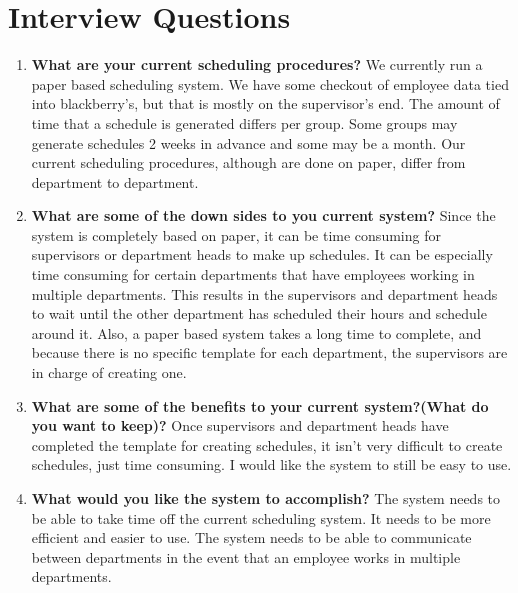 \documentclass[letterpaper,12pt]{report}
\begin{document}
\chapter{Interview Questions}
\lhead{\textcolor{custom}{\appendixname \space \thechapter}}
\begin{enumerate}
 \item \textbf{What are your current scheduling procedures?}\newline
We currently run a paper based scheduling system. We have some checkout of employee data tied into blackberry’s, but that is mostly on the supervisor’s end. The amount of time that a schedule is generated differs per group. Some groups may generate schedules 2 weeks in advance and some may be a month. Our current scheduling procedures, although are done on paper, differ from department to department.
 \item \textbf{What are some of the down sides to you current system?} \newline
 Since the system is completely based on paper, it can be time consuming for supervisors or department heads to make up schedules. It can be especially time consuming for certain departments that have employees working in multiple departments. This results in the supervisors and department heads to wait until the other department has scheduled their hours and schedule around it. Also, a paper based system takes a long time to complete, and because there is no specific template for each department, the supervisors are in charge of creating one.

 \item \textbf{What are some of the benefits to your current system?(What do you want to keep)?}\newline
 Once supervisors and department heads have completed the template for creating schedules, it isn’t very difficult to create schedules, just time consuming. I would like the system to still be easy to use. 
 \item \textbf{What would you like the system to accomplish?}\newline
 The system needs to be able to take time off the current scheduling system.  It needs to be more efficient and easier to use. The system needs to be able to communicate between departments in the event that an employee works in multiple departments. 


\end{enumerate}
\end{document}

